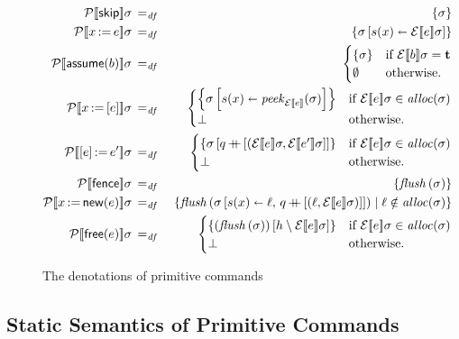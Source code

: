 \documentclass[11pt]{report}
\begin{document}
\begin{figure}[h]
	\centering
		\begin{eqnarray*}
			\dnpcomm{\cskip}\sigma & \eqdef & \set{\sigma} \\
			\dnpcomm{\cassign{x}{e}}\sigma & \eqdef & \set{\recup{\sigma}{s(x)}{\dnexpr{e}\sigma}}\\ 
			\dnpcomm{\cassume{b}}\sigma & \eqdef & \begin{cases}
				\set{\sigma} & \text{if $\dnexpr{b}\sigma = \bvt$} \\
				\emptyset & \text{otherwise.}
			\end{cases} \\
			\dnpcomm{\cload{x}{e}}\sigma & \eqdef & \begin{cases}	\set{\recup{\sigma}{s(x)}{\speek{\dnexpr{e}}{\sigma}}} & \text{if $\dnexpr{e}\sigma \in \alloc{\sigma}$} \\ 
			\bot & \text{otherwise.}
			\end{cases} \\
			\dnpcomm{\cstore{e}{e'}}\sigma & \eqdef & \begin{cases} 	\set{\funup{\sigma}{\ptapp{q}{\lsingle{(\dnexpr{e}\sigma, \dnexpr{e'}\sigma}}}} & \text{if $\dnexpr{e}\sigma \in \alloc{\sigma}$} \\	
			\bot & \text{otherwise.}
			\end{cases}  \\
			\dnpcomm{\cfence}\sigma & \eqdef & \set{\sflush{\sigma}} \\
			\dnpcomm{\cnew{x}{e}}\sigma & \eqdef & \setof{\sflush{\funup{\sigma}{\ptup{s(x)}{\ell},\,\ptapp{q}{\lsingle{(\ell,\dnexpr{e}\sigma)}}}}}{\ell \notin \alloc{\sigma}}\\
			\dnpcomm{\cfree{e}}\sigma & \eqdef & \begin{cases}	\set{\funup{(\sflush{\sigma})}{h \setminus \dnexpr{e}\sigma}} & \text{if $\dnexpr{e}\sigma \in \alloc{\sigma}$} \\
			\bot & \text{otherwise.}
			\end{cases}
		\end{eqnarray*}
	\caption{The denotations of primitive commands}
	\label{fig:dnpcomm}
\end{figure}


\subsection{Static Semantics of Primitive Commands} %
\label{sub:static_semantics_of_primitive_commands}
\end{document}
